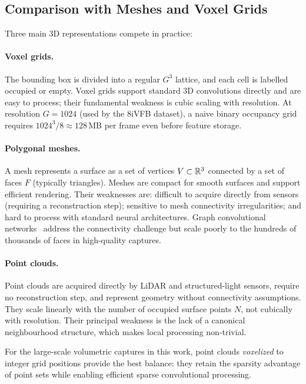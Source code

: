 \subsection{Comparison with Meshes and Voxel Grids}

Three main 3D representations compete in practice:

\paragraph{Voxel grids.}
The bounding box is divided into a regular $G^3$ lattice, and each cell
is labelled occupied or empty.
Voxel grids support standard 3D convolutions directly and are easy to
process; their fundamental weakness is cubic scaling with resolution.
At resolution $G = 1024$ (used by the 8iVFB dataset), a naive binary
occupancy grid requires $1024^3 / 8 \approx 128$\,MB per frame even before
feature storage.

\paragraph{Polygonal meshes.}
A mesh represents a surface as a set of vertices $V \subset \mathbb{R}^3$ connected
by a set of faces $F$ (typically triangles).
Meshes are compact for smooth surfaces and support efficient rendering.
Their weaknesses are: difficult to acquire directly from sensors (requiring
a reconstruction step); sensitive to mesh connectivity irregularities;
and hard to process with standard neural architectures.
Graph convolutional networks~\cite{wang2019dynamic} address the connectivity
challenge but scale poorly to the hundreds of thousands of faces in
high-quality captures.

\paragraph{Point clouds.}
Point clouds are acquired directly by LiDAR and structured-light sensors,
require no reconstruction step, and represent geometry without connectivity
assumptions.
They scale linearly with the number of occupied surface points $N$,
not cubically with resolution.
Their principal weakness is the lack of a canonical neighbourhood structure,
which makes local processing non-trivial.

For the large-scale volumetric captures in this work, point clouds
\emph{voxelized} to integer grid positions provide the best balance:
they retain the sparsity advantage of point sets while enabling efficient
sparse convolutional processing.

